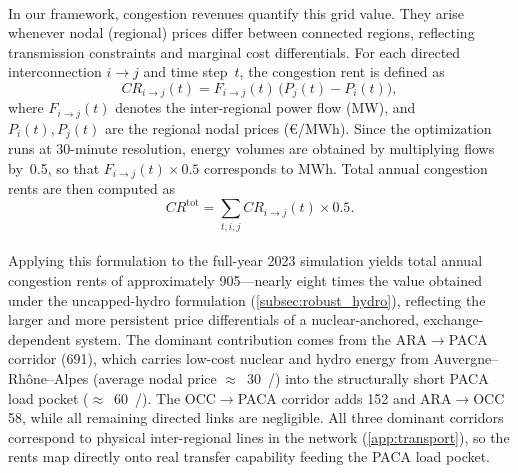 \documentclass[12pt]{article}
\begin{document}
\paragraph{}
In our framework, congestion revenues quantify this grid value.
They arise whenever nodal (regional) prices differ between connected regions,
reflecting transmission constraints and marginal cost differentials.
For each directed interconnection $i \to j$ and time step~$t$,
the congestion rent is defined as
\begin{equation}
  CR_{i \to j}(t) = F_{i \to j}(t)\, \big(P_j(t) - P_i(t)\big),
\end{equation}
where $F_{i \to j}(t)$ denotes the inter-regional power flow (MW),
and $P_i(t),P_j(t)$ are the regional nodal prices (€/MWh).
Since the optimization runs at 30-minute resolution, energy volumes are obtained by
multiplying flows by~0.5, so that $F_{i \to j}(t)\!\times\!0.5$ corresponds to MWh.
Total annual congestion rents are then computed as
\begin{equation}
  CR^{\text{tot}} = \sum_{t,i,j} CR_{i \to j}(t)\times0.5.
\end{equation}

\paragraph{}
Applying this formulation to the full-year 2023 simulation yields total annual congestion rents of approximately \SI{905}{\MEUR}---nearly eight times the value obtained under the uncapped-hydro formulation (\cref{subsec:robust_hydro}), reflecting the larger and more persistent price differentials of a nuclear-anchored, exchange-dependent system. The dominant contribution comes from the ARA$\to$PACA corridor (\SI{691}{\MEUR}), which carries low-cost nuclear and hydro energy from Auvergne--Rhône--Alpes (average nodal price \(\approx\)~\SI{30}{\EUR/\MWh}) into the structurally short PACA load pocket (\(\approx\)~\SI{60}{\EUR/\MWh}). The OCC$\to$PACA corridor adds \SI{152}{\MEUR} and ARA$\to$OCC \SI{58}{\MEUR}, while all remaining directed links are negligible. All three dominant corridors correspond to physical inter-regional lines in the network (\cref{app:transport}), so the rents map directly onto real transfer capability feeding the PACA load pocket.
\end{document}
